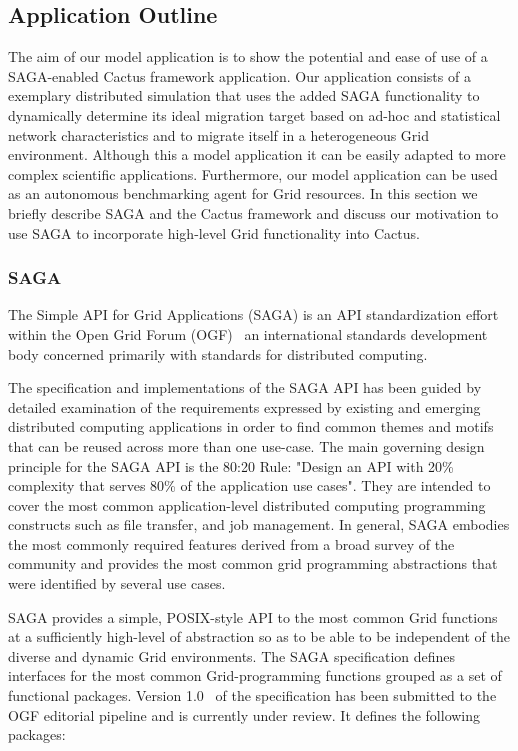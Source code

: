 \documentclass[conference,final]{IEEEtran}
\begin{document}
\subsection{Application Outline}

The aim of our model application is to show the potential and ease of
use of a SAGA-enabled Cactus framework application. Our application
consists of a exemplary distributed simulation that uses the added
SAGA functionality to dynamically determine its ideal migration target
based on ad-hoc and statistical network characteristics and to migrate
itself in a heterogeneous Grid environment.  Although this a model
application it can be easily adapted to more complex scientific
applications.  Furthermore, our model application can be used as an
autonomous benchmarking agent for Grid resources. In this section we
briefly describe SAGA and the Cactus framework and discuss our
motivation to use SAGA to incorporate high-level Grid functionality
into Cactus.

\subsubsection{SAGA}

The Simple API for Grid Applications (SAGA) is an API standardization
effort within the Open Grid Forum (OGF)~\cite{ogf_web} an
international standards development body concerned primarily with
standards for distributed computing.

The specification and implementations of the SAGA API has been guided
by detailed examination of the requirements expressed by existing and
emerging distributed computing applications in order to find common
themes and motifs that can be reused across more than one use-case.
The main governing design principle for the SAGA API is the 80:20
Rule: "Design an API with 20\% complexity that serves 80\% of the
application use cases".  They are intended to cover the most common
application-level distributed computing programming constructs such as
file transfer, and job management.  In general, SAGA embodies the most
commonly required features derived from a broad survey of the
community and provides the most common grid programming abstractions
that were identified by several use cases.

SAGA provides a simple, POSIX-style API to the most common Grid
functions at a sufficiently high-level of abstraction so as to be able
to be independent of the diverse and dynamic Grid environments.  The
SAGA specification defines interfaces for the most common
Grid-programming functions grouped as a set of functional packages.
Version 1.0~\cite{saga-core} of the specification has been submitted
to the OGF editorial pipeline and is currently under review.  It
defines the following packages:
\end{document}
